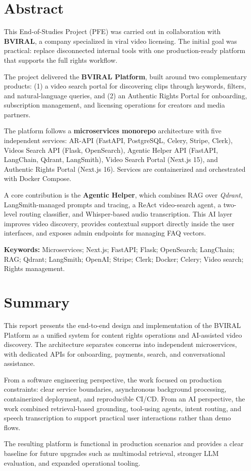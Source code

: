\chapter*{Abstract}

This End-of-Studies Project (PFE) was carried out in collaboration with
\textbf{BVIRAL}, a company specialized in viral video licensing. The initial
goal was practical: replace disconnected internal tools with one
production-ready platform that supports the full rights workflow.

The project delivered the \textbf{BVIRAL Platform}, built around two
complementary products: (1) a video search portal for discovering clips through
keywords, filters, and natural-language queries, and (2) an Authentic Rights
Portal for onboarding, subscription management, and licensing operations for
creators and media partners.

The platform follows a \textbf{microservices monorepo} architecture with five
independent services: AR-API (FastAPI, PostgreSQL, Celery, Stripe, Clerk),
Videos Search API (Flask, OpenSearch), Agentic Helper API (FastAPI, LangChain,
Qdrant, LangSmith), Video Search Portal (Next.js 15), and Authentic Rights
Portal (Next.js 16). Services are containerized and orchestrated with Docker
Compose.

A core contribution is the \textbf{Agentic Helper}, which combines RAG over
\textit{Qdrant}, LangSmith-managed prompts and tracing, a ReAct video-search
agent, a two-level routing classifier, and Whisper-based audio
transcription. This AI layer improves video discovery, provides contextual
support directly inside the user interfaces, and exposes admin endpoints for
managing FAQ vectors.

\bigskip
\noindent\textbf{Keywords:} Microservices; Next.js; FastAPI; Flask;
OpenSearch; LangChain; RAG; Qdrant; LangSmith; OpenAI; Stripe;
Clerk; Docker; Celery; Video search; Rights management.

\newpage
\chapter*{Summary}

This report presents the end-to-end design and implementation of the BVIRAL
Platform as a unified system for content rights operations and AI-assisted
video discovery. The architecture separates concerns into independent
microservices, with dedicated APIs for onboarding, payments, search, and
conversational assistance.

From a software engineering perspective, the work focused on production
constraints: clear service boundaries, asynchronous background processing,
containerized deployment, and reproducible CI/CD. From an AI perspective, the
work combined retrieval-based grounding, tool-using agents, intent routing, and
speech transcription to support practical user interactions rather than demo
flows.

The resulting platform is functional in production scenarios and provides a
clear baseline for future upgrades such as multimodal retrieval, stronger LLM
evaluation, and expanded operational tooling.
